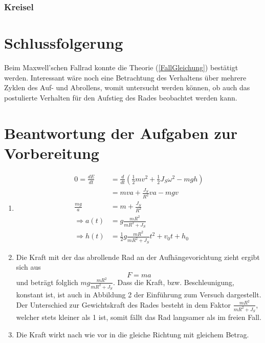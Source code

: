 \documentclass[
	a4paper,
	12pt,
	pagesize,
	ngerman
]{scrartcl}
\begin{document}
	\subsubsection{Kreisel}
	
	\section{Schlussfolgerung}
	Beim Maxwell'schen Fallrad konnte die Theorie (\cref{FallGleichung}) bestätigt werden. Interessant wäre noch eine Betrachtung des Verhaltens über mehrere Zyklen des Auf- und Abrollens, womit untersucht werden können, ob auch das postulierte Verhalten für den Aufstieg des Rades beobachtet werden kann. %
	
	\section{Beantwortung der Aufgaben zur Vorbereitung}
	\begin{enumerate}
		\item 
			\begin{align}
				0 = \frac{dE}{dt} &= \frac{d}{dt}(\frac{1}{2} m v^2 + \frac{1}{2} J_S \omega^2 - mgh) \\
				&= mva + \frac{J_S}{R^2}va - mgv\\
				\frac{mg}{a} &= m + \frac{J_S}{R^2} \\
				\Rightarrow a(t) &= g \frac{mR^2}{mR^2+J_S} \\
				\Rightarrow h(t) &= \frac{1}{2} g\frac{mR^2}{mR^2+J_S} t^2 + v_0t + h_0
			\end{align}
		\item
			Die Kraft mit der das abrollende Rad an der Aufhängevorichtung zieht ergibt sich aus 
			\begin{equation}
				F = ma
			\end{equation}
			und beträgt folglich $mg\frac{mR^2}{mR^2+J_S}$. 
			Dass die Kraft, bzw. Beschleunigung, konstant ist, ist auch in Abbildung 2 der Einführung zum Versuch dargestellt. 
			Der Unterschied zur Gewichtskraft des Rades besteht in dem Faktor $\frac{mR^2}{mR^2+J_S}$, welcher stets kleiner als 1 ist, somit fällt das Rad langsamer als im freien Fall.
		\item
			Die Kraft wirkt nach wie vor in die gleiche Richtung mit gleichem Betrag.
	\end{enumerate}
\end{document}

